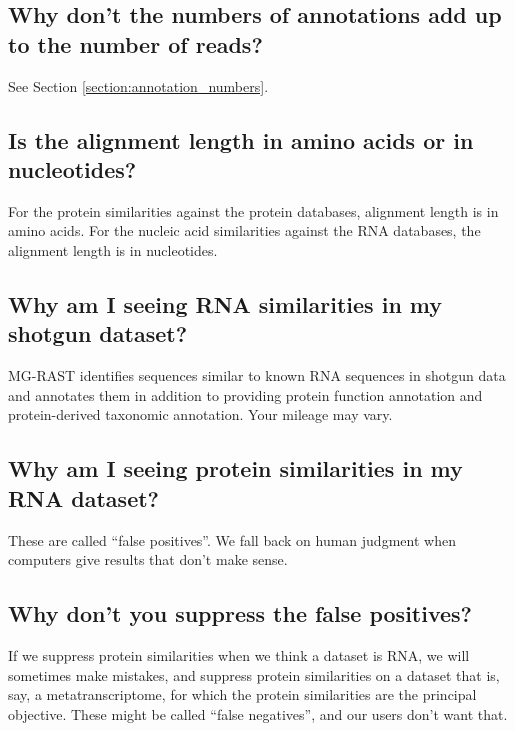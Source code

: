 \documentclass[12pt,fullpage]{report}
\begin{document}
\subsection*{Why don't the numbers of annotations add up to the number of reads?}
See Section \ref{section:annotation_numbers}.
\subsection*{Is the alignment length in amino acids or in nucleotides?}
For the protein similarities against the protein databases, alignment length is in amino acids.  For the nucleic acid similarities against the RNA databases, the alignment length is in nucleotides.
\subsection*{Why am I seeing RNA similarities in my shotgun dataset?}
MG-RAST identifies sequences similar to known RNA sequences in shotgun data and annotates them in addition to providing protein function annotation and protein-derived taxonomic annotation.  Your mileage may vary.
\subsection*{Why am I seeing protein similarities in my RNA dataset?}
These are called ``false positives''.   We fall back on human judgment when computers give results that don't make sense.
\subsection*{Why don't you suppress the false positives?}
If we suppress protein similarities when we think a dataset is RNA, we will sometimes make mistakes, and suppress protein similarities on a dataset that is, say, a metatranscriptome, for which the protein similarities are the principal objective.   These might be called ``false negatives'', and our users don't want that.
\end{document}

